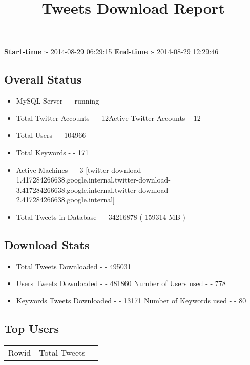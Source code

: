 \documentclass{article}\usepackage[T1]{fontenc}
\begin{document}
\title{\textbf{Tweets Download Report}}
               \date{}
                \maketitle
               \centerline{\textbf{Start-time} :- 2014-08-29 06:29:15 \hspace{40pt} \textbf{End-time} :- 2014-08-29 12:29:46}               \subsection*{Overall Status}                \begin{itemize}                \item MySQL Server - - running               \item Total Twitter Accounts - - 12\newline Active Twitter Accounts -- 12               \item Total Users - - 104966               \item Total Keywords - - 171               \item Active Machines - - 3 [twitter-download-1.417284266638.google.internal,twitter-download-3.417284266638.google.internal,twitter-download-2.417284266638.google.internal]               \item Total Tweets in Database - - 34216878 ( 159314 MB )               \end{itemize}               \subsection*{Download Stats}                \begin{itemize}                \item Total Tweets Downloaded - - 495031               \item Users Tweets Downloaded - - 481860 \newline Number of Users used - - 778               \item Keywords Tweets Downloaded - - 13171 \newline Number of Keywords used - - 80              \end{itemize}              \subsection*{Top Users}\begin{tabular}{|c|c|c|}         \hline         Rowid & Total Tweets \\ 

\end{tabular}
\end{document}
